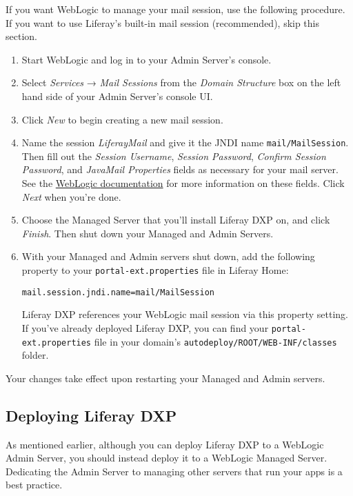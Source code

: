 If you want WebLogic to manage your mail session, use the following
procedure. If you want to use Liferay's built-in mail session
(recommended), skip this section.

\begin{enumerate}
\def\labelenumi{\arabic{enumi}.}
\item
  Start WebLogic and log in to your Admin Server's console.
\item
  Select \emph{Services} → \emph{Mail Sessions} from the \emph{Domain
  Structure} box on the left hand side of your Admin Server's console
  UI.
\item
  Click \emph{New} to begin creating a new mail session.
\item
  Name the session \emph{LiferayMail} and give it the JNDI name
  \texttt{mail/MailSession}. Then fill out the \emph{Session Username},
  \emph{Session Password}, \emph{Confirm Session Password}, and
  \emph{JavaMail Properties} fields as necessary for your mail server.
  See the
  \href{http://docs.oracle.com/middleware/1221/wls/FMWCH/pagehelp/Mailcreatemailsessiontitle.html}{WebLogic
  documentation} for more information on these fields. Click \emph{Next}
  when you're done.
\item
  Choose the Managed Server that you'll install Liferay DXP on, and
  click \emph{Finish}. Then shut down your Managed and Admin Servers.
\item
  With your Managed and Admin servers shut down, add the following
  property to your \texttt{portal-ext.properties} file in Liferay Home:

\begin{verbatim}
mail.session.jndi.name=mail/MailSession
\end{verbatim}

  Liferay DXP references your WebLogic mail session via this property
  setting. If you've already deployed Liferay DXP, you can find your
  \texttt{portal-ext.properties} file in your domain's
  \texttt{autodeploy/ROOT/WEB-INF/classes} folder.
\end{enumerate}

Your changes take effect upon restarting your Managed and Admin servers.

\subsection{Deploying Liferay DXP}\label{deploying-liferay-dxp-4}

As mentioned earlier, although you can deploy Liferay DXP to a WebLogic
Admin Server, you should instead deploy it to a WebLogic Managed Server.
Dedicating the Admin Server to managing other servers that run your apps
is a best practice.


